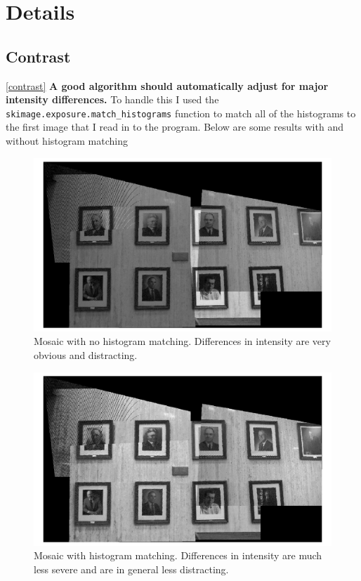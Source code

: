 \documentclass[]{article}
\begin{document}
\section{Details}
	\subsection{Contrast}
	\ref{contrast}
	\textbf{A good algorithm should automatically adjust for major intensity differences.}
	\vskip 10pt
	To handle this I used the \texttt{skimage.exposure.match\_histograms} function to match all of the histograms to the first image that I read in to the program. Below are some results with and without histogram matching
	
	\begin{figure}[H]
		\centering
		\includegraphics[width=6.5in]{test_images/no_hist_match.png}
		\caption{Mosaic with no histogram matching. Differences in intensity are very obvious and distracting.}
	\end{figure}
	
	\begin{figure}[H]
		\centering
		\includegraphics[width=6.5in]{test_images/hist_match.png}
		\caption{Mosaic with histogram matching. Differences in intensity are much less severe and are in general less distracting.}
	\end{figure}
	
\end{document}
